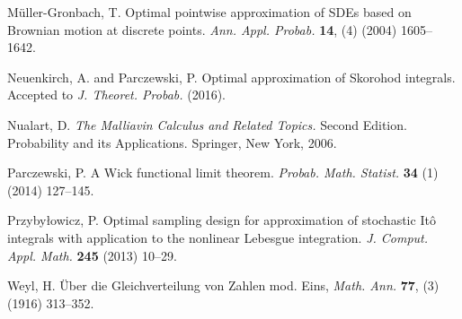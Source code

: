 \documentclass[a4paper,11pt,reqno]{amsart}
\theoremstyle{plain}
\numberwithin{equation}{section}
\begin{document}
\begin{thebibliography}{plain}
 M\"uller-Gronbach, T.
Optimal pointwise approximation of SDEs based on Brownian motion at discrete points. \textit{Ann. Appl. Probab.} \textbf{14}, (4) (2004) 1605--1642.


 Neuenkirch, A. and Parczewski, P. Optimal approximation of Skorohod integrals. Accepted to \textit{J. Theoret. Probab.} (2016).


 Nualart, D.
\textit{The Malliavin Calculus and Related Topics.} Second Edition. Probability and its Applications. Springer, New York, 2006. 


 Parczewski, P. A Wick functional limit theorem. \textit{Probab. Math. Statist.} \textbf{34} (1) (2014) 127--145.



  Przyby\l owicz, P.
Optimal sampling design for approximation of stochastic It\^o integrals with application to the nonlinear Lebesgue integration. 
\textit{J. Comput. Appl. Math.} \textbf{245} (2013) 10--29. 


 Weyl, H. \"Uber die Gleichverteilung von Zahlen mod. Eins, \textit{Math. Ann.} \textbf{77}, (3) (1916) 313--352.

\end{thebibliography}
\end{document}
